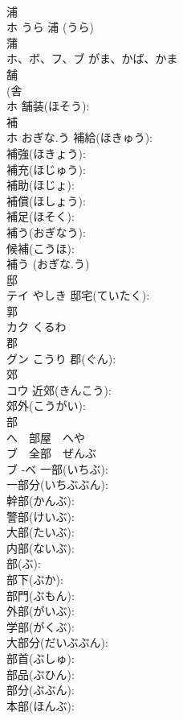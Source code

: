 \documentclass[8pt]{extreport}
\begin{document}
\begin{CJK}{UTF8}{min}
\\	浦			
\\	ホ	うら		浦 (うら)
\\	蒲			
\\	ホ、ボ、フ、ブ	がま、かば、かま		
\\	舗			
\\	(舎 
\\	ホ		舗装(ほそう): 
\\	補			
\\	ホ	おぎな.う	補給(ほきゅう): 
\\	補強(ほきょう): 
\\	補充(ほじゅう): 
\\	補助(ほじょ): 
\\	補償(ほしょう): 
\\	補足(ほそく): 
\\	補う(おぎなう): 
\\	候補(こうほ): 
\\	補う (おぎな.う)
\\	邸			
\\	テイ	やしき	邸宅(ていたく): 
\\	郭			
\\	カク	くるわ		
\\	郡			
\\	グン	こうり	郡(ぐん): 
\\	郊			
\\	コウ		近郊(きんこう): 
\\	郊外(こうがい): 
\\	部			
\\	へ　部屋　へや
\\	ブ　全部　ぜんぶ
\\	ブ	-べ	一部(いちぶ): 
\\	一部分(いちぶぶん): 
\\	幹部(かんぶ): 
\\	警部(けいぶ): 
\\	大部(たいぶ): 
\\	内部(ないぶ): 
\\	部(ぶ): 
\\	部下(ぶか): 
\\	部門(ぶもん): 
\\	外部(がいぶ): 
\\	学部(がくぶ): 
\\	大部分(だいぶぶん): 
\\	部首(ぶしゅ): 
\\	部品(ぶひん): 
\\	部分(ぶぶん): 
\\	本部(ほんぶ): 

\end{CJK}
\end{document}
